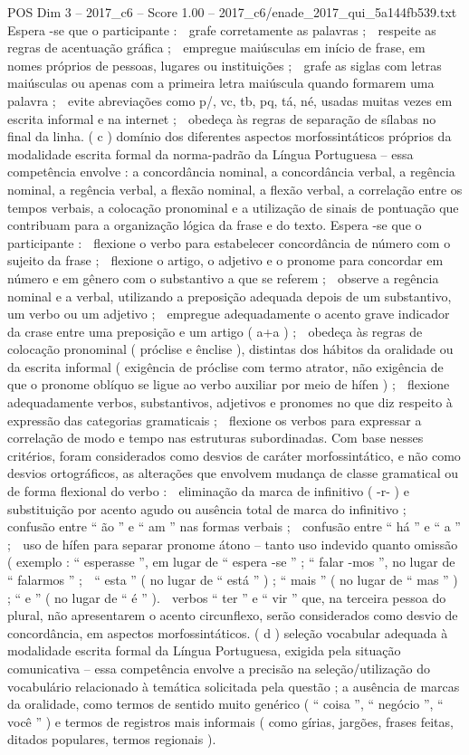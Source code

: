 \begin{textsample}{POS Dim 3 – 2017\_c6 – Score 1.00 – 2017\_c6/enade\_2017\_qui\_5a144fb539.txt}
Espera -se que o participante :  grafe corretamente as palavras ;  respeite as regras de acentuação gráfica ;  empregue maiúsculas em início de frase, em nomes próprios de pessoas, lugares ou instituições ;  grafe as siglas com letras maiúsculas ou apenas com a primeira letra maiúscula quando formarem uma palavra ;  evite abreviações como p/, vc, tb, pq, tá, né, usadas muitas vezes em escrita informal e na internet ;  obedeça às regras de separação de sílabas no final da linha. ( c ) domínio dos diferentes aspectos morfossintáticos próprios da modalidade escrita formal da norma-padrão da Língua Portuguesa – essa competência envolve : a concordância nominal, a concordância verbal, a regência nominal, a regência verbal, a flexão nominal, a flexão verbal, a correlação entre os tempos verbais, a colocação pronominal e a utilização de sinais de pontuação que contribuam para a organização lógica da frase e do texto.
Espera -se que o participante :  flexione o verbo para estabelecer concordância de número com o sujeito da frase ;  flexione o artigo, o adjetivo e o pronome para concordar em número e em gênero com o substantivo a que se referem ;  observe a regência nominal e a verbal, utilizando a preposição adequada depois de um substantivo, um verbo ou um adjetivo ;  empregue adequadamente o acento grave indicador da crase entre uma preposição e um artigo ( a+a ) ;  obedeça às regras de colocação pronominal ( próclise e ênclise ), distintas dos hábitos da oralidade ou da escrita informal ( exigência de próclise com termo atrator, não exigência de que o pronome oblíquo se ligue ao verbo auxiliar por meio de hífen ) ;  flexione adequadamente verbos, substantivos, adjetivos e pronomes no que diz respeito à expressão das categorias gramaticais ;  flexione os verbos para expressar a correlação de modo e tempo nas estruturas subordinadas.
Com base nesses critérios, foram considerados como desvios de caráter morfossintático, e não como desvios ortográficos, as alterações que envolvem mudança de classe gramatical ou de forma flexional do verbo :  eliminação da marca de infinitivo ( -r- ) e substituição por acento agudo ou ausência total de marca do infinitivo ;  confusão entre “ ão ” e “ am ” nas formas verbais ;  confusão entre “ há ” e “ a ” ;  uso de hífen para separar pronome átono – tanto uso indevido quanto omissão ( exemplo : “ esperasse ”, em lugar de “ espera -se ” ; “ falar -mos ”, no lugar de “ falarmos ” ;  “ esta ” ( no lugar de “ está ” ) ; “ mais ” ( no lugar de “ mas ” ) ; “ e ” ( no lugar de “ é ” ).  verbos “ ter ” e “ vir ” que, na terceira pessoa do plural, não apresentarem o acento circunflexo, serão considerados como desvio de concordância, em aspectos morfossintáticos. ( d ) seleção vocabular adequada à modalidade escrita formal da Língua Portuguesa, exigida pela situação comunicativa – essa competência envolve a precisão na seleção/utilização do vocabulário relacionado à temática solicitada pela questão ; a ausência de marcas da oralidade, como termos de sentido muito genérico ( “ coisa ”, “ negócio ”, “ você ” ) e termos de registros mais informais ( como gírias, jargões, frases feitas, ditados populares, termos regionais ).

\end{textsample}
